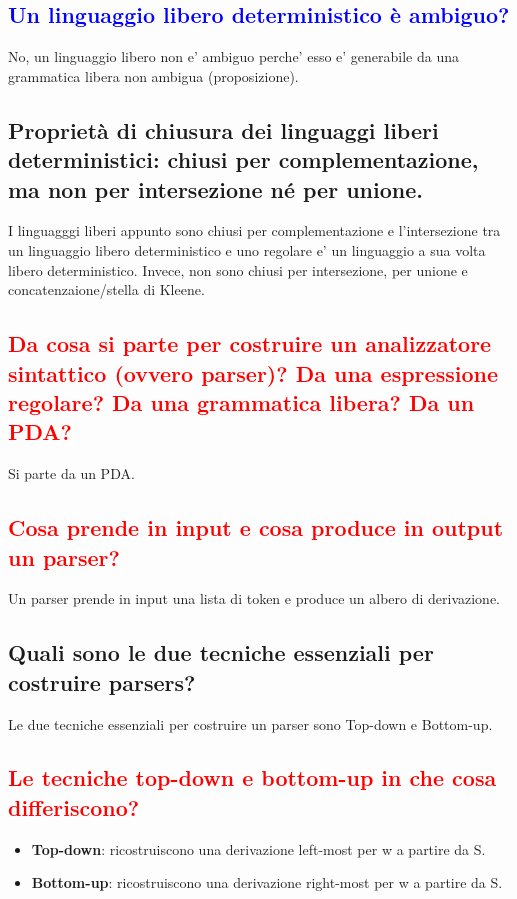 \documentclass{article}
\begin{document}
\subsection{\textcolor{blue}{Un linguaggio libero deterministico è ambiguo?}}
No, un linguaggio libero non e' ambiguo perche' esso e' generabile da una
grammatica libera non ambigua (proposizione).

\subsection{Proprietà di chiusura dei linguaggi liberi deterministici: chiusi per complementazione, ma non per intersezione né per unione.}
I linguagggi liberi appunto sono chiusi per complementazione e l'intersezione
tra un linguaggio libero deterministico e uno regolare e' un linguaggio a sua
volta libero deterministico. Invece, non sono chiusi per intersezione, per
unione e concatenzaione/stella di Kleene.
\subsection{\textcolor{red}{Da cosa si parte per costruire un analizzatore sintattico (ovvero parser)? Da una espressione regolare? Da una grammatica libera? Da un PDA?}}
Si parte da un PDA.
\subsection{\textcolor{red}{Cosa prende in input e cosa produce in output un parser?}}
Un parser prende in input una lista di token e produce un albero di
derivazione.
\subsection{Quali sono le due tecniche essenziali per costruire parsers?}
Le due tecniche essenziali per costruire un parser sono Top-down e Bottom-up.
\subsection{\textcolor{red}{Le tecniche top-down e bottom-up in che cosa differiscono?}}
\begin{itemize}
    \item \textbf{Top-down}: ricostruiscono una derivazione left-most per w a partire da S.
    \item \textbf{Bottom-up}: ricostruiscono una derivazione right-most per w a partire da S.
\end{itemize}
\end{document}
